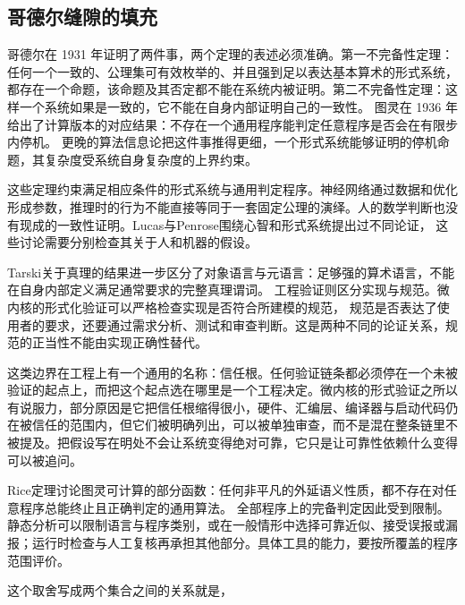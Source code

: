 \subsection{哥德尔缝隙的填充}

哥德尔在 1931 年证明了两件事，两个定理的表述必须准确。第一不完备性定理：任何一个一致的、公理集可有效枚举的、并且强到足以表达基本算术的形式系统，都存在一个命题，该命题及其否定都不能在系统内被证明。第二不完备性定理：这样一个系统如果是一致的，它不能在自身内部证明自己的一致性。\cite{godel1931} 图灵在 1936 年给出了计算版本的对应结果：不存在一个通用程序能判定任意程序是否会在有限步内停机。\cite{turing1936} 更晚的算法信息论把这件事推得更细，一个形式系统能够证明的停机命题，其复杂度受系统自身复杂度的上界约束。\cite{chaitin1987}


这些定理约束满足相应条件的形式系统与通用判定程序。神经网络通过数据和优化形成参数，推理时的行为不能直接等同于一套固定公理的演绎。人的数学判断也没有现成的一致性证明。Lucas与Penrose围绕心智和形式系统提出过不同论证，\cite{lucas1961minds,penrose1989emperor} 这些讨论需要分别检查其关于人和机器的假设。


Tarski关于真理的结果进一步区分了对象语言与元语言：足够强的算术语言，不能在自身内部定义满足通常要求的完整真理谓词。\cite{tarski1936wahrheitsbegriff} 工程验证则区分实现与规范。微内核的形式化验证可以严格检查实现是否符合所建模的规范，\cite{klein2009sel4} 规范是否表达了使用者的要求，还要通过需求分析、测试和审查判断。这是两种不同的论证关系，规范的正当性不能由实现正确性替代。

这类边界在工程上有一个通用的名称：信任根。任何验证链条都必须停在一个未被验证的起点上，而把这个起点选在哪里是一个工程决定。微内核的形式验证之所以有说服力，部分原因是它把信任根缩得很小，硬件、汇编层、编译器与启动代码仍在被信任的范围内，但它们被明确列出，可以被单独审查，而不是混在整条链里不被提及。把假设写在明处不会让系统变得绝对可靠，它只是让可靠性依赖什么变得可以被追问。


Rice定理讨论图灵可计算的部分函数：任何非平凡的外延语义性质，都不存在对任意程序总能终止且正确判定的通用算法。\cite{rice1953classes} 全部程序上的完备判定因此受到限制。静态分析可以限制语言与程序类别，或在一般情形中选择可靠近似、接受误报或漏报；运行时检查与人工复核再承担其他部分。具体工具的能力，要按所覆盖的程序范围评价。

这个取舍写成两个集合之间的关系就是，

